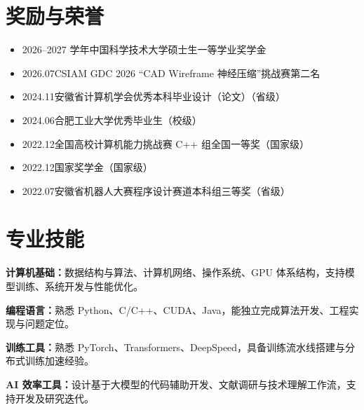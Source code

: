 \documentclass[11pt,a4paper]{article}
\begin{document}
\section{奖励与荣誉}
\begin{itemize}
\item 2026--2027 学年\quad 中国科学技术大学硕士生一等学业奖学金
\item 2026.07\quad CSIAM GDC 2026 “CAD Wireframe 神经压缩”挑战赛第二名
\item 2024.11\quad 安徽省计算机学会优秀本科毕业设计（论文）（省级）
\item 2024.06\quad 合肥工业大学优秀毕业生（校级）
\item 2022.12\quad 全国高校计算机能力挑战赛 C++ 组全国一等奖（国家级）
\item 2022.12\quad 国家奖学金（国家级）
\item 2022.07\quad 安徽省机器人大赛程序设计赛道本科组三等奖（省级）
\end{itemize}

\section{专业技能}
\textbf{计算机基础：}数据结构与算法、计算机网络、操作系统、GPU 体系结构，支持模型训练、系统开发与性能优化。

\textbf{编程语言：}熟悉 Python、C/C++、CUDA、Java，能独立完成算法开发、工程实现与问题定位。

\textbf{训练工具：}熟悉 PyTorch、Transformers、DeepSpeed，具备训练流水线搭建与分布式训练加速经验。

\textbf{AI 效率工具：}设计基于大模型的代码辅助开发、文献调研与技术理解工作流，支持开发及研究迭代。
\end{document}
